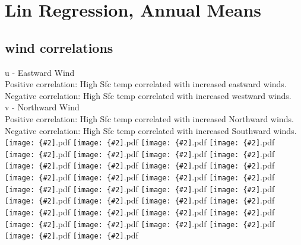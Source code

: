 \documentclass[12pt,a4paper]{article}
\newcommand{\pdffig}[2][0.5]{\texttt{[image: \{\#2]}.pdf}}
\begin{document}
\section{Lin Regression, Annual Means}
\subsection{wind correlations}
u - Eastward Wind\\
Positive correlation: High Sfc temp correlated with increased eastward winds.\\
Negative correlation: High Sfc temp correlated with increased westward winds.\\
v - Northward Wind\\
Positive correlation: High Sfc temp correlated with increased Northward winds.\\
Negative correlation: High Sfc temp correlated with increased Southward winds.\\
\pdffig[0.5]{Lin_Regression_Aus_tsfc_u_hig}
\pdffig[0.5]{Lin_Regression_Aus_tsfc_u_low}
\pdffig[0.5]{Lin_Regression_Aus_tsfc_v_high}
\pdffig[0.5]{Lin_Regression_Aus_tsfc_v_low}
\pdffig[0.5]{Lin_Regression_Aus_tsfc_w_high}
\pdffig[0.5]{Lin_Regression_Aus_tsfc_w_low}
\pdffig[0.5]{Lin_Regression_India_tsfc_u_hig}
\pdffig[0.5]{Lin_Regression_India_tsfc_u_low}
\pdffig[0.5]{Lin_Regression_India_tsfc_v_high}
\pdffig[0.5]{Lin_Regression_India_tsfc_v_low}
\pdffig[0.5]{Lin_Regression_India_tsfc_w_high}
\pdffig[0.5]{Lin_Regression_India_tsfc_w_low}
\pdffig[0.5]{Lin_Regression_MC_tsfc_u_hig}
\pdffig[0.5]{Lin_Regression_MC_tsfc_u_low}
\pdffig[0.5]{Lin_Regression_MC_tsfc_v_high}
\pdffig[0.5]{Lin_Regression_MC_tsfc_v_low}
\pdffig[0.5]{Lin_Regression_MC_tsfc_w_high}
\pdffig[0.5]{Lin_Regression_MC_tsfc_w_low}
\pdffig[0.5]{Lin_Regression_NthEastAfr_tsfc_u_hig}
\pdffig[0.5]{Lin_Regression_NthEastAfr_tsfc_u_low}
\pdffig[0.5]{Lin_Regression_NthEastAfr_tsfc_v_high}
\pdffig[0.5]{Lin_Regression_NthEastAfr_tsfc_v_low}
\pdffig[0.5]{Lin_Regression_NthEastAfr_tsfc_w_high}
\pdffig[0.5]{Lin_Regression_NthEastAfr_tsfc_w_low}
\pdffig[0.5]{Lin_Regression_NthWestAfr_tsfc_u_hig}
\pdffig[0.5]{Lin_Regression_NthWestAfr_tsfc_u_low}
\pdffig[0.5]{Lin_Regression_NthWestAfr_tsfc_v_high}
\pdffig[0.5]{Lin_Regression_NthWestAfr_tsfc_v_low}
\pdffig[0.5]{Lin_Regression_NthWestAfr_tsfc_w_high}
\pdffig[0.5]{Lin_Regression_NthWestAfr_tsfc_w_low}
\pdffig[0.5]{Lin_Regression_SthAfr_tsfc_u_hig}
\pdffig[0.5]{Lin_Regression_SthAfr_tsfc_u_low}
\pdffig[0.5]{Lin_Regression_SthAfr_tsfc_v_high}
\pdffig[0.5]{Lin_Regression_SthAfr_tsfc_v_low}
\end{document}
